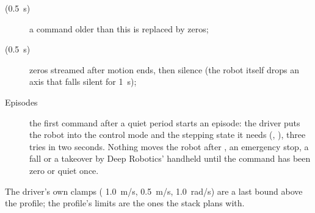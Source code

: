 \begin{description}
  \item[ (\SI{0.5}{s})] a command older than this is replaced by zeros;
  \item[ (\SI{0.5}{s})] zeros streamed after motion ends, then silence (the
    robot itself drops an axis that falls silent for \SI{1}{s});
  \item[Episodes] the first command after a quiet period starts an episode: the driver puts the
    robot into the control mode and the stepping state it needs (,
    ), three tries in two seconds. Nothing moves the robot after
    , an emergency stop, a fall or a takeover by Deep Robotics' handheld until the
    command has been zero or quiet once.
\end{description}

The driver's own clamps ( \SI{1.0}{m/s},  \SI{0.5}{m/s},
 \SI{1.0}{rad/s}) are a last bound above the profile; the profile's limits are the
ones the stack plans with.
